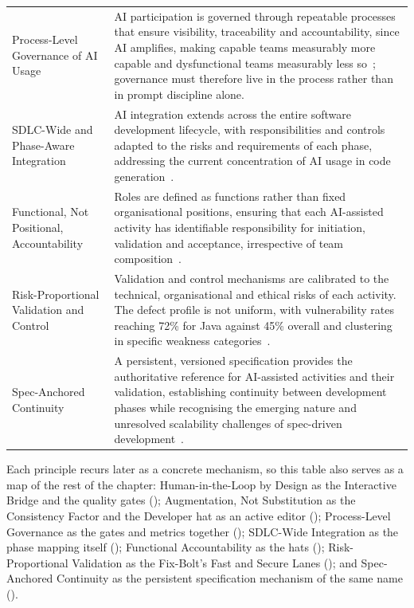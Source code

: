 {\begin{longtable}{>{\raggedright\arraybackslash}p{3.4cm}
                  >{\raggedright\arraybackslash}p{11.6cm}}
Process-Level Governance of \ac{AI} Usage &
AI participation is governed through repeatable processes that ensure visibility, traceability and accountability, since \ac{AI} amplifies, making capable teams measurably more capable and dysfunctional teams measurably less so~\cite{DORA:2025ai}; governance must therefore live in the process rather than in prompt discipline alone. \\
\addlinespace

\ac{SDLC}-Wide and Phase-Aware Integration &
AI integration extends across the entire software development lifecycle, with responsibilities and controls adapted to the risks and requirements of each phase, addressing the current concentration of AI usage in code generation~\cite{Ahmed:2025ai, Hou:2025cl, Zhang:2025ea}. \\
\addlinespace

Functional, Not Positional, Accountability &
Roles are defined as functions rather than fixed organisational positions, ensuring that each AI-assisted activity has identifiable responsibility for initiation, validation and acceptance, irrespective of team composition~\cite{Ahmed:2025ai, Banh:2025cf}. \\
\addlinespace

Risk-Proportional Validation and Control &
Validation and control mechanisms are calibrated to the technical, organisational and ethical risks of each activity. The defect profile is not uniform, with vulnerability rates reaching 72\% for Java against 45\% overall and clustering in specific weakness categories~\cite{Veracode:2025gen, Zhao:2025vibe}. \\
\addlinespace

Spec-Anchored Continuity &
A persistent, versioned specification provides the authoritative reference for AI-assisted activities and their validation, establishing continuity between development phases while recognising the emerging nature and unresolved scalability challenges of spec-driven development~\cite{Thoughtworks:2025SD, Farrag:2026sd}. \\

\end{longtable}
}

Each principle recurs later as a concrete mechanism, so this table also serves as a map of the rest of the chapter: Human-in-the-Loop by Design as the Interactive Bridge and the quality gates (); Augmentation, Not Substitution as the Consistency Factor and the Developer hat as an active editor (); Process-Level Governance as the gates and metrics together (); \ac{SDLC}-Wide Integration as the phase mapping itself (); Functional Accountability as the hats (); Risk-Proportional Validation as the Fix-Bolt's Fast and Secure Lanes (); and Spec-Anchored Continuity as the persistent specification mechanism of the same name ().

